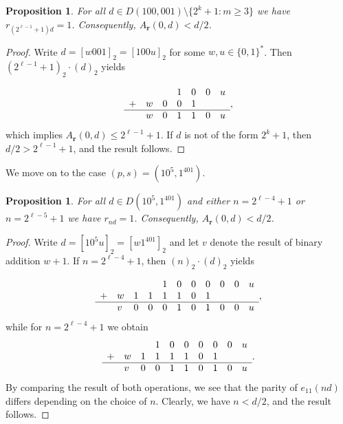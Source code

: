 \documentclass[a4paper,11pt]{amsart}
\newtheorem{prop}[thm]{Proposition}
\theoremstyle{definition}
\begin{document}
\begin{prop} \label{prop:problematic1}
For all $d \in D(100,001) \setminus \{2^k+1: m \geq 3\}$ we have $r_{(2^{\ell-1}+1)d}=1$. Consequently, $A_{\mathbf{r}}(0,d) < d/2$.
\end{prop}
\begin{proof}
Write $d = [w001]_2 = [100u]_2$ for some $w,u \in \{0,1\}^*$. Then $(2^{\ell-1}+1)_2 \cdot (d)_2$ yields

$$ \begin{array}{lllllllll}
        &   &   & 1 & 0  & 0 & u  \\
+       & w & 0 & 0 & 1  &   &    \\
\hline  & w & 0 & 1 & 1  & 0 & u         
\end{array}, $$
which implies $A_{\mathbf{r}}(0,d) \leq 2^{\ell-1}+1$. If $d$ is not of the form $2^k+1$, then $d/2 > 2^{\ell-1}+1$, and the result follows.
\end{proof}

We move on to the case $(p,s) = (10^5,1^401)$.

\begin{prop} \label{lem:problematic3}
For all $d \in D(10^5,1^401)$ and either $n = 2^{\ell-4}+1$ or $n = 2^{\ell-5}+1$ we have $r_{nd} = 1$. Consequently, $A_{\mathbf{r}}(0,d)<d/2$.
\end{prop}
\begin{proof}
Write $d = [10^5u]_2 = [w1^401]_2$ and let $v$ denote the result of binary addition $w + 1$.
If $n = 2^{\ell-4}+1$, then $(n)_2 \cdot (d)_2$ yields

$$ \begin{array}{lllllllllll}
       &    &   &   & 1 & 0  &  0 & 0 & 0 & 0 & u \\
+      &  w & 1 & 1 & 1 & 1  &  0 & 1 &   &   &   \\
\hline &  v & 0 & 0 & 0 & 1  &  0 & 1 & 0 & 0 & u        
\end{array}, $$
while for $n = 2^{\ell-4}+1$ we obtain
$$ \begin{array}{lllllllllll}
       &    &   & 1 & 0 & 0  &  0 & 0 & 0 & u  \\
+      &  w & 1 & 1 & 1 & 1  &  0 & 1 &   &    \\
\hline &  v & 0 & 0 & 1 & 1  &  0 & 1 & 0 & u       
\end{array}. $$
By comparing the result of both operations, we see that the parity of $e_{11}(nd)$ differs depending on the choice of $n$. Clearly, we have $n < d/2$, and the result follows.
\end{proof}
\end{document}
